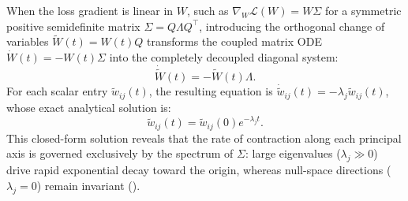 \documentclass[11pt, oneside, openany]{book}
\begin{document}
When the loss gradient is linear in $W$, such as $\nabla_{W} \mathcal{L}(W) = W \Sigma$ for a symmetric positive semidefinite matrix $\Sigma = Q \Lambda Q^{\top}$, introducing the orthogonal change of variables $\tilde{W}(t) = W(t) Q$ transforms the coupled matrix ODE $\dot{W}(t) = -W(t) \Sigma$ into the completely decoupled diagonal system:
\begin{equation}
\label{eq:B.9}
\dot{\tilde{W}}(t) = -\tilde{W}(t) \Lambda.
\end{equation}
For each scalar entry $\tilde{w}_{ij}(t)$, the resulting equation is $\dot{\tilde{w}}_{ij}(t) = -\lambda_{j} \tilde{w}_{ij}(t)$, whose exact analytical solution is:
\begin{equation}
\label{eq:B.10}
\tilde{w}_{ij}(t) = \tilde{w}_{ij}(0) e^{-\lambda_{j} t}.
\end{equation}
This closed-form solution reveals that the rate of contraction along each principal axis is governed exclusively by the spectrum of $\Sigma$: large eigenvalues ($\lambda_{j} \gg 0$) drive rapid exponential decay toward the origin, whereas null-space directions ($\lambda_{j} = 0$) remain invariant ().


\backmatter



\end{document}
